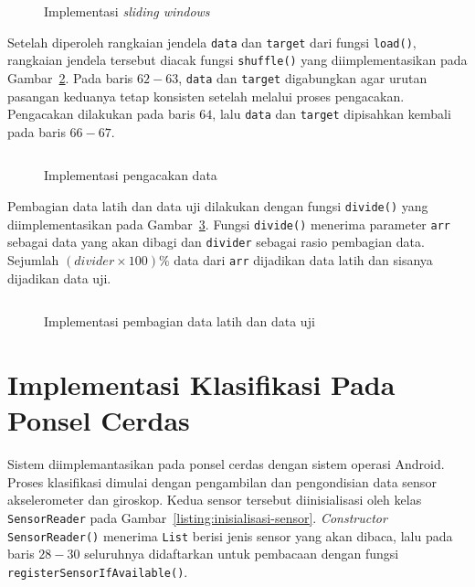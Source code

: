 \begin{figure}[h]
    \inputminted[firstline=47,firstnumber=47,lastline=58]{python}{../har/data.py}
    \caption{Implementasi \textit{sliding windows}}
    \label{listing:data-sliding-window}
\end{figure}

Setelah diperoleh rangkaian jendela \texttt{data} dan \texttt{target} dari fungsi \texttt{load()}, rangkaian jendela tersebut diacak fungsi \texttt{shuffle()} yang diimplementasikan pada Gambar~\ref{listing:data-pengacakan-data}. Pada baris $62-63$, \texttt{data} dan \texttt{target} digabungkan agar urutan pasangan keduanya tetap konsisten setelah melalui proses pengacakan. Pengacakan dilakukan pada baris $64$, lalu \texttt{data} dan \texttt{target} dipisahkan kembali pada baris $66-67$.

\begin{figure}[h]
    \inputminted[firstline=61,firstnumber=61,lastline=69]{python}{../har/data.py}
    \caption{Implementasi pengacakan data}
    \label{listing:data-pengacakan-data}
\end{figure}

Pembagian data latih dan data uji dilakukan dengan fungsi \texttt{divide()} yang diimplementasikan pada Gambar~\ref{listing:data-pembagian-data-latih-uji}. Fungsi \texttt{divide()} menerima parameter \texttt{arr} sebagai data yang akan dibagi dan \texttt{divider} sebagai rasio pembagian data. Sejumlah $(divider \times 100) \%$ data dari \texttt{arr} dijadikan data latih dan sisanya dijadikan data uji.

\begin{figure}[h]
    \inputminted[firstline=72,firstnumber=72,lastline=76]{python}{../har/data.py}
    \caption{Implementasi pembagian data latih dan data uji}
    \label{listing:data-pembagian-data-latih-uji}
\end{figure}

\section{Implementasi Klasifikasi Pada Ponsel Cerdas}
Sistem diimplemantasikan pada ponsel cerdas dengan sistem operasi Android. Proses klasifikasi dimulai dengan pengambilan dan pengondisian data sensor akselerometer dan giroskop. Kedua sensor tersebut diinisialisasi oleh kelas \texttt{SensorReader} pada Gambar~\ref{listing:inisialisasi-sensor}. \textit{Constructor} \texttt{SensorReader()} menerima \texttt{List} berisi jenis sensor yang akan dibaca, lalu pada baris $28-30$ seluruhnya didaftarkan untuk pembacaan dengan fungsi \texttt{registerSensorIfAvailable()}.

